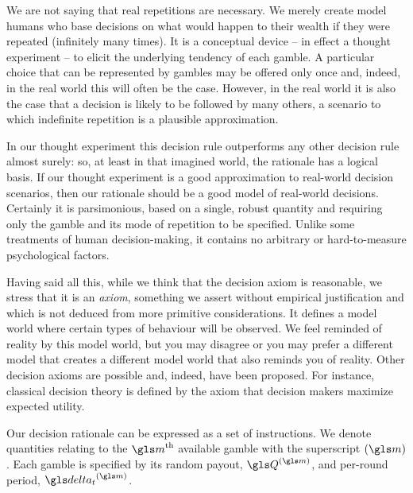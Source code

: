 We are not saying that real repetitions are necessary. We 
merely create model humans who base decisions on what would 
happen to their wealth if they were repeated (infinitely many times). It is a 
conceptual device -- in effect a thought experiment -- to elicit the 
underlying tendency of each gamble. A particular choice that can be 
represented by gambles 
may be offered only once and, indeed, in the real world this will 
often be the case. However, in the real world it is also the case 
that a decision is likely to be followed by many others, a scenario 
to which indefinite repetition is a plausible approximation.

In our thought experiment this decision rule outperforms any other 
decision rule almost surely: so, at least in that imagined world, the 
rationale has a logical basis. If our thought experiment is a good 
approximation to real-world decision scenarios, then our rationale 
should be a good model of real-world decisions. Certainly it is 
parsimonious, based on a single, 
robust quantity and requiring only the gamble and its mode of repetition 
to be specified. Unlike some treatments of human decision-making, it 
contains no arbitrary or hard-to-measure psychological factors.

Having said all this, while we think that the decision axiom 
is reasonable, we stress that it is an \textit{axiom}, \ie something we assert without empirical justification and which is not deduced from more primitive considerations. It 
defines a model world where certain types of behaviour will be observed. 
We feel reminded of reality by this model world, but you may disagree 
or you may prefer a different model that creates a different model world
that also reminds you of reality.
Other decision axioms are 
possible and, indeed, have been proposed. For instance, 
classical decision theory is defined by the axiom that decision
makers maximize expected utility. 


Our decision rationale can be expressed as a set of instructions.
We denote quantities relating to the $\m^\text{th}$ available gamble with the 
superscript $(\m)$. Each gamble is specified by its random payout, $\Q^{(\m)}$, and 
per-round period, $\dt^{(\m)}$. 

